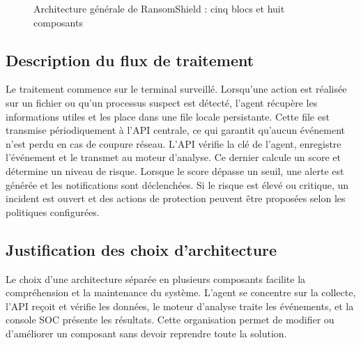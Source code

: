 \begin{figure}[htbp]
{%
}
\caption{Architecture générale de RansomShield : cinq blocs et huit composants}
\label{fig:architecture-generale-ransomshield}
\end{figure}

\subsection{Description du flux de traitement}

Le traitement commence sur le terminal surveillé. Lorsqu'une action est réalisée sur un fichier ou qu'un processus suspect est détecté, l'agent récupère les informations utiles et les place dans une file locale persistante. Cette file est transmise périodiquement à l'API centrale, ce qui garantit qu'aucun événement n'est perdu en cas de coupure réseau. L'API vérifie la clé de l'agent, enregistre l'événement et le transmet au moteur d'analyse. Ce dernier calcule un score et détermine un niveau de risque. Lorsque le score dépasse un seuil, une alerte est générée et les notifications sont déclenchées. Si le risque est élevé ou critique, un incident est ouvert et des actions de protection peuvent être proposées selon les politiques configurées.

\subsection{Justification des choix d'architecture}

Le choix d'une architecture séparée en plusieurs composants facilite la compréhension et la maintenance du système. L'agent se concentre sur la collecte, l'API reçoit et vérifie les données, le moteur d'analyse traite les événements, et la console SOC présente les résultats. Cette organisation permet de modifier ou d'améliorer un composant sans devoir reprendre toute la solution.


